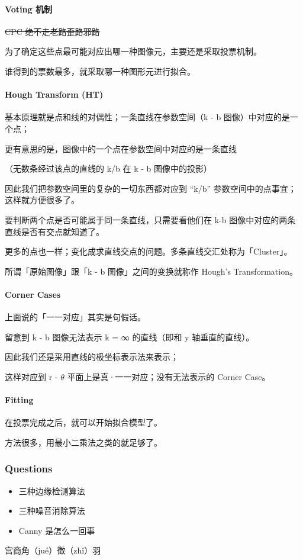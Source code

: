 \documentclass[
]{article}
\begin{document}
\hypertarget{header-n166}{%
\paragraph{Voting 机制}\label{header-n166}}

\sout{CPC 绝不走老路歪路邪路}

为了确定这些点最可能对应出哪一种图像元，主要还是采取投票机制。

谁得到的票数最多，就采取哪一种图形元进行拟合。

\hypertarget{header-n170}{%
\paragraph{Hough Transform (HT)}\label{header-n170}}

基本原理就是点和线的对偶性；一条直线在参数空间（k - b
图像）中对应的是一个点；

更有意思的是，图像中的一个点在参数空间中对应的是一条直线

（无数条经过该点的直线的 k/b 在 k - b 图像中的投影）

因此我们把参数空间里的复杂的一切东西都对应到 ``k/b''
参数空间中的点事宜；这样就方便很多了。

要判断两个点是否可能属于同一条直线，只需要看他们在 k-b
图像中对应的两条直线是否有交点就知道了。

更多的点也一样；变化成求直线交点的问题。多条直线交汇处称为「Cluster」。

所谓「原始图像」跟「k - b 图像」之间的变换就称作 Hough's
Transformation。

\hypertarget{header-n178}{%
\paragraph{Corner Cases}\label{header-n178}}

上面说的「一一对应」其实是句假话。

留意到 k - b 图像无法表示 k = ∞ 的直线（即和 y 轴垂直的直线）。

因此我们还是采用直线的极坐标表示法来表示；

这样对应到 r - \(\theta\) 平面上是真·一一对应；没有无法表示的 Corner
Case。

\hypertarget{header-n183}{%
\paragraph{Fitting}\label{header-n183}}

在投票完成之后，就可以开始拟合模型了。

方法很多，用最小二乘法之类的就足够了。

\hypertarget{header-n186}{%
\subsubsection{Questions}\label{header-n186}}

\begin{itemize}
\item
  三种边缘检测算法
\item
  三种噪音消除算法
\item
  Canny 是怎么一回事
\end{itemize}

宫商角（jué）徵（zhǐ）羽
\end{document}
